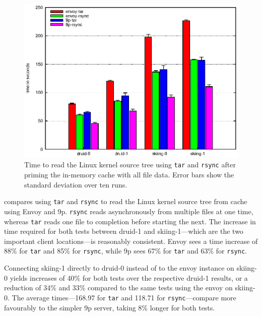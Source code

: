 \begin{figure}[t]
\centering
\includegraphics[width=\figwidth]{figures/arch-rsync-tar-hot}
\caption[\texttt{tar} and \texttt{rsync} benchmark results with a hot cache]{Time to read the Linux kernel source tree using \texttt{tar} and \texttt{rsync} after priming the in-memory cache with all file data. Error bars show the standard deviation over ten runs.}
\label{fig:arch-rsync-tar-hot}
\end{figure}

 compares using \texttt{tar} and \texttt{rsync} to read the Linux kernel source tree from cache using Envoy and 9p. \texttt{rsync} reads asynchronously from multiple files at one time, whereas \texttt{tar} reads one file to completion before starting the next. The increase in time required for both tests between druid-1 and skiing-1---which are the two important client locations---is reasonably consistent. Envoy sees a time increase of 88\% for \texttt{tar} and 85\% for \texttt{rsync}, while 9p sees 67\% for \texttt{tar} and 63\% for \texttt{rsync}.

Connecting skiing-1 directly to druid-0 instead of to the envoy instance on skiing-0 yields increases of 40\% for both tests over the respective druid-1 results, or a reduction of 34\% and 33\% compared to the same tests using the envoy on skiing-0. The average times---168.97 for \texttt{tar} and 118.71 for \texttt{rsync}---compare more favourably to the simpler 9p server, taking 8\% longer for both tests.

